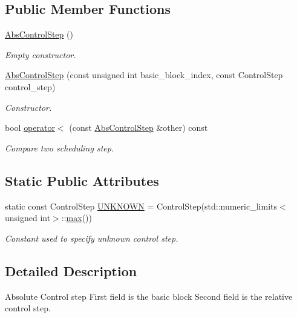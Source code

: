 \subsection*{Public Member Functions}
\begin{DoxyCompactItemize}
\item 
\hyperlink{structAbsControlStep_aaabb6e2bd6562f29b95f8259e5dfc4a4}{Abs\+Control\+Step} ()
\begin{DoxyCompactList}\small\item\em Empty constructor. \end{DoxyCompactList}\item 
\hyperlink{structAbsControlStep_a2559549c06bfc138bd9829b7874770b4}{Abs\+Control\+Step} (const unsigned int basic\+\_\+block\+\_\+index, const Control\+Step control\+\_\+step)
\begin{DoxyCompactList}\small\item\em Constructor. \end{DoxyCompactList}\item 
bool \hyperlink{structAbsControlStep_a92a593be50a54d4dbcc844972add11e3}{operator$<$} (const \hyperlink{structAbsControlStep}{Abs\+Control\+Step} \&other) const
\begin{DoxyCompactList}\small\item\em Compare two scheduling step. \end{DoxyCompactList}\end{DoxyCompactItemize}
\subsection*{Static Public Attributes}
\begin{DoxyCompactItemize}
\item 
static const Control\+Step \hyperlink{structAbsControlStep_a69f07dd88767800287378631f3fd18bf}{U\+N\+K\+N\+O\+WN} = Control\+Step(std\+::numeric\+\_\+limits$<$unsigned int$>$\+::\hyperlink{tutorial__pact__2019_2Target-Customization_2first_2hint_8c_a28f422940797ea297699ba55d89171c5}{max}())
\begin{DoxyCompactList}\small\item\em Constant used to specify unknown control step. \end{DoxyCompactList}\end{DoxyCompactItemize}


\subsection{Detailed Description}
Absolute Control step First field is the basic block Second field is the relative control step. 

